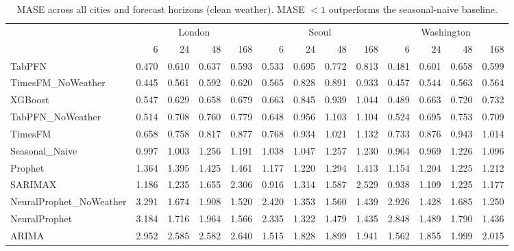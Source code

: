 \begin{table}[ht!]
\centering
\caption{MASE across all cities and forecast horizons (clean weather). MASE $< 1$ outperforms the seasonal-naive baseline.}
\label{tab:mase_cross_city}
{\small\setlength{\tabcolsep}{3pt}\scriptsize
\begin{tabular}{lrrrrrrrrrrrr}
\toprule
 & \multicolumn{4}{c}{London} & \multicolumn{4}{c}{Seoul} & \multicolumn{4}{c}{Washington} \\
 & 6 & 24 & 48 & 168 & 6 & 24 & 48 & 168 & 6 & 24 & 48 & 168 \\
\midrule
TabPFN & 0.470 & 0.610 & 0.637 & 0.593 & 0.533 & 0.695 & 0.772 & 0.813 & 0.481 & 0.601 & 0.658 & 0.599 \\
TimesFM_NoWeather & 0.445 & 0.561 & 0.592 & 0.620 & 0.565 & 0.828 & 0.891 & 0.933 & 0.457 & 0.544 & 0.563 & 0.564 \\
XGBoost & 0.547 & 0.629 & 0.658 & 0.679 & 0.663 & 0.845 & 0.939 & 1.044 & 0.489 & 0.663 & 0.720 & 0.732 \\
TabPFN_NoWeather & 0.514 & 0.708 & 0.760 & 0.779 & 0.648 & 0.956 & 1.103 & 1.104 & 0.524 & 0.695 & 0.753 & 0.709 \\
TimesFM & 0.658 & 0.758 & 0.817 & 0.877 & 0.768 & 0.934 & 1.021 & 1.132 & 0.733 & 0.876 & 0.943 & 1.014 \\
Seasonal_Naive & 0.997 & 1.003 & 1.256 & 1.191 & 1.038 & 1.047 & 1.257 & 1.230 & 0.964 & 0.969 & 1.226 & 1.096 \\
Prophet & 1.364 & 1.395 & 1.425 & 1.461 & 1.177 & 1.220 & 1.294 & 1.413 & 1.154 & 1.204 & 1.225 & 1.212 \\
SARIMAX & 1.186 & 1.235 & 1.655 & 2.306 & 0.916 & 1.314 & 1.587 & 2.529 & 0.938 & 1.109 & 1.225 & 1.177 \\
NeuralProphet_NoWeather & 3.291 & 1.674 & 1.908 & 1.520 & 2.420 & 1.353 & 1.560 & 1.439 & 2.926 & 1.428 & 1.685 & 1.250 \\
NeuralProphet & 3.184 & 1.716 & 1.964 & 1.566 & 2.335 & 1.322 & 1.479 & 1.435 & 2.848 & 1.489 & 1.790 & 1.436 \\
ARIMA & 2.952 & 2.585 & 2.582 & 2.640 & 1.515 & 1.828 & 1.899 & 1.941 & 1.562 & 1.855 & 1.999 & 2.015 \\
\bottomrule
\end{tabular}
}
\end{table}
